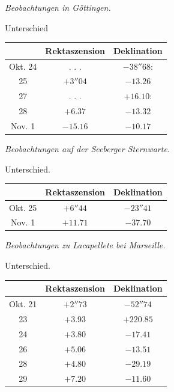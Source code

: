\medskip
{}\noindent\emph{Beobachtungen in Göttingen.} 

\begin{center}
Unterschied

\fontsize{10}{12}\selectfont\setlength{\tabcolsep}{7pt}\renewcommand{\arraystretch}{1.15}\begin{tabular}{|c|c|c|}
\hline
 & Rektaszension & Deklination \\
\hline
Okt. 24 & . . . & $-38''68$: \\
25 & $+3''04$ & $-13.26$ \\
27 & . . . & $+16.10$: \\
28 & $+6.37$ & $-13.32$ \\
Nov. 1 & $-15.16$ & $-10.17$ \\
\hline
\end{tabular}
\end{center}

\noindent\emph{Beobachtungen auf der Seeberger Sternwarte.}

\begin{center}
Unterschied.

\fontsize{10}{12}\selectfont\setlength{\tabcolsep}{7pt}\renewcommand{\arraystretch}{1.15}\begin{tabular}{|c|c|c|}
\hline
 & Rektaszension & Deklination \\
\hline
Okt. 25 & $+6''44$ & $-23''41$ \\
Nov. 1 & $+11.71$ & $-37.70$ \\
\hline
\end{tabular}
\end{center}

\medskip
{}\noindent\emph{Beobachtungen zu Lacapellete bei Marseille.}

\begin{center}
Unterschied.

\fontsize{10}{12}\selectfont\setlength{\tabcolsep}{7pt}\renewcommand{\arraystretch}{1.15}\begin{tabular}{|c|c|c|}
\hline
 & Rektaszension & Deklination \\
\hline
Okt. 21 & $+2''73$ & $-52''74$ \\
23 & $+3.93$ & $+220.85$ \\
24 & $+3.80$ & $-17.41$ \\
26 & $+5.06$ & $-13.51$ \\
28 & $+4.80$ & $-29.19$ \\
29 & $+7.20$ & $-11.60$ \\
\hline
\end{tabular}
\end{center}

